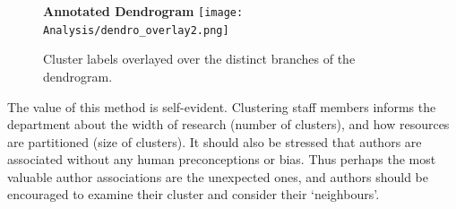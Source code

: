 \begin{center}
\begin{figure}[H]
  \centering
  \textbf{Annotated Dendrogram}
    \texttt{[image: Analysis/dendro\_overlay2.png]}
    \caption[Dendrogram annotated with labelled fields]{Cluster labels overlayed over the distinct branches of the dendrogram.}
    \label{fig:LABELLEDDENDRO}
\end{figure} 
\end{center}
The value of this method is self-evident. Clustering staff members informs the department about the width of research (number of clusters), and how resources are partitioned (size of clusters). It should also be stressed that authors are associated without any human preconceptions or bias. Thus perhaps the most valuable author associations are the unexpected ones, and authors should be encouraged to examine their cluster and consider their `neighbours'.
